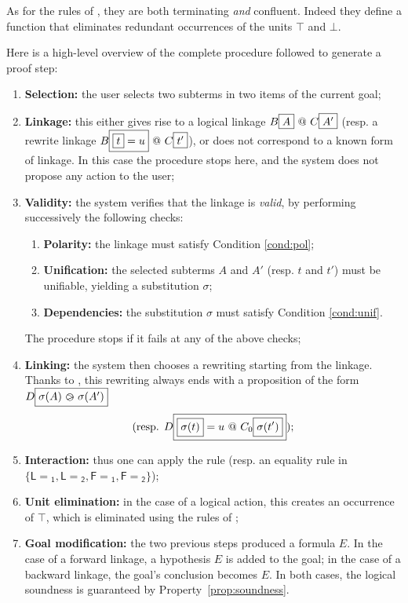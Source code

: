 As for the rules of , they are both terminating
\emph{and} confluent. Indeed they define a function that eliminates redundant
occurrences of the units $\top$ and $\bot$.

Here is a high-level overview of the complete procedure followed to generate a
proof step:
\begin{enumerate}
\item \textbf{Selection:} the user selects two subterms in two items of the current goal; \label{step:selection}
\item \textbf{Linkage:} this either gives rise to a logical linkage $B\fbox{$A$}
  \operatorname{\,@\,} C\fbox{$A'$}$ (resp. a rewrite linkage $B\fbox{$\fbox{$t$} = u$} \operatorname{\,@\,}
  C\fbox{$t'$}$), or does not correspond to a known form of linkage. In this case
  the procedure stops here, and the system does not propose any action to the
  user; \label{step:linkage}
\item \textbf{Validity:} the system verifies that the linkage is \emph{valid},
  by performing successively the following checks:
  \begin{enumerate}
    \item \textbf{Polarity:} the linkage must satisfy Condition \ref{cond:pol};
    \item \textbf{Unification:} the selected subterms $A$ and $A'$ (resp. $t$
    and $t'$) must be unifiable, yielding a substitution $\sigma$;
    \item \textbf{Dependencies:} the substitution $\sigma$ must satisfy
    Condition \ref{cond:unif}.
  \end{enumerate}
  The procedure stops if it fails at any of the above checks;
  \label{step:validity}
\item \textbf{Linking:} the system then chooses a rewriting start\-ing from the
  linkage. Thanks to , this re\-writing always ends with a
  proposition of the form $D\fbox{$\sigma(A) \operatorname{\,\varogreaterthan\,} \sigma(A')$}$ $$\text{(resp.
  $D\fbox{$\fbox{$\sigma(t)$} = u \operatorname{\,@\,} C_0\fbox{$\sigma(t')$}$}$);}$$
  \label{step:linking}
\item \textbf{Interaction:} thus one can apply the {} rule (resp. an equality rule in
$\{\mathsf{L\!\!=\!\!_1}, \mathsf{L\!\!=\!\!_2}, \mathsf{F\!\!=\!\!_1},
\mathsf{F\!\!=\!\!_2}\}$); \label{step:interaction}
\item \textbf{Unit elimination:} in the case of a logical action, this creates an occurrence of $\top$,
which is eliminated using the rules of ; \label{step:unit-elimination}
\item \textbf{Goal modification:} the two previous steps produced a formula $E$.
  In the case of a forward linkage, a hypothesis $E$ is added to the goal; in
  the case of a backward linkage, the goal's conclusion becomes $E$. In both
  cases, the logical soundness is guaranteed by
  Property~\ref{prop:soundness}. \label{step:goal-modification}
\end{enumerate}

